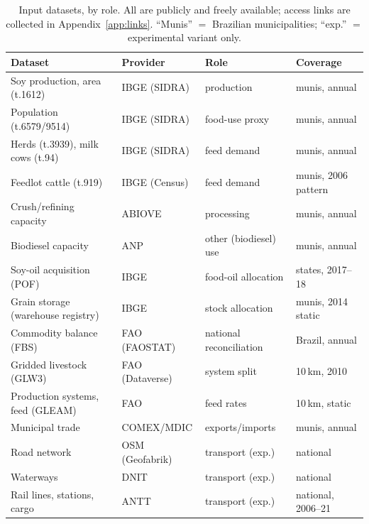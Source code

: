 \documentclass[pdflatex,sn-nature]{sn-jnl}%
\begin{document}
\begin{table}[htbp]
\small
\caption{Input datasets, by role. All are publicly and freely available;
access links are collected in Appendix~\ref{app:links}. ``Munis'' $=$
Brazilian municipalities; ``exp.'' $=$ experimental variant only.}\label{tab:data}
\begin{tabular}{@{}p{3.5cm}p{2.3cm}p{3.0cm}p{2.6cm}@{}}
\toprule
Dataset & Provider & Role & Coverage \\
\midrule
Soy production, area (t.1612)      & IBGE (SIDRA)        & production            & munis, annual \\
Population (t.6579/9514)           & IBGE (SIDRA)        & food-use proxy        & munis, annual \\
Herds (t.3939), milk cows (t.94)   & IBGE (SIDRA)        & feed demand           & munis, annual \\
Feedlot cattle (t.919)             & IBGE (Census)       & feed demand           & munis, 2006 pattern \\
Crush/refining capacity            & ABIOVE              & processing            & munis, annual \\
Biodiesel capacity                 & ANP                 & other (biodiesel) use & munis, annual \\
Soy-oil acquisition (POF)          & IBGE                & food-oil allocation   & states, 2017--18 \\
Grain storage (warehouse registry) & IBGE                & stock allocation      & munis, 2014 static \\
Commodity balance (FBS)            & FAO (FAOSTAT)       & national reconciliation & Brazil, annual \\
Gridded livestock (GLW3)           & FAO (Dataverse)     & system split          & 10\,km, 2010 \\
Production systems, feed (GLEAM)    & FAO                 & feed rates            & 10\,km, static \\
Municipal trade                    & COMEX/MDIC          & exports/imports       & munis, annual \\
Road network                       & OSM (Geofabrik)     & transport (exp.)      & national \\
Waterways                          & DNIT                & transport (exp.)      & national \\
Rail lines, stations, cargo        & ANTT                & transport (exp.)      & national, 2006--21 \\

\end{tabular}
\end{table}
\end{document}
